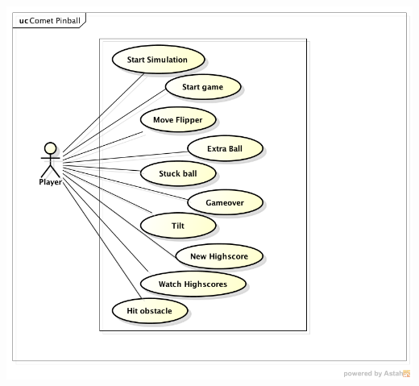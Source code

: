 \documentclass[fontsize=12pt,
               paper=a4,
               twoside=false,
               parskip=half,
               ]{scrartcl}
\begin{document}
\includegraphics[width=15cm]{./img/usecase-model.png}
\end{document}
